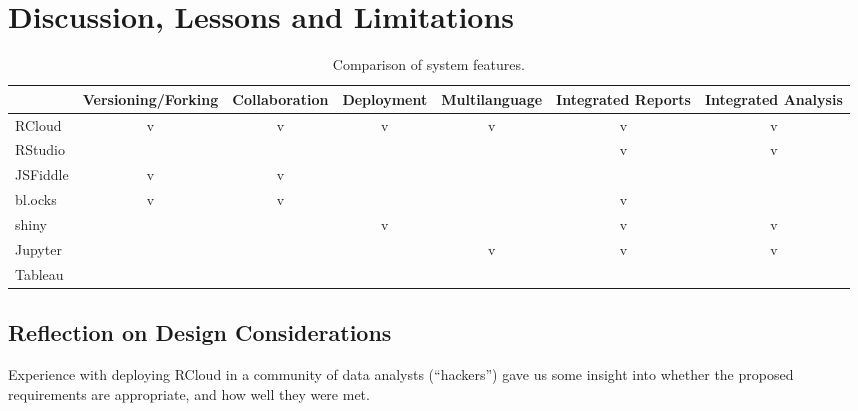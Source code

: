 \section{Discussion, Lessons and Limitations}
\label{sec:discussion}

\begin{table*}
  \centering
  \begin{tabular}{l|cccccc}
           & Versioning/Forking & Collaboration & Deployment & Multilanguage & Integrated Reports & Integrated Analysis \\
    \hline
RCloud     &       v            &       v       &     v      &      v        &           v        &           v         \\
RStudio    &                    &               &            &               &           v        &           v         \\
JSFiddle   &       v            &       v       &            &               &                    &                     \\
bl.ocks    &       v            &       v       &            &               &           v        &                     \\
shiny      &                    &               &     v      &               &           v        &           v         \\
Jupyter    &                    &               &            &      v        &           v        &           v         \\
Tableau    &                    &               &            &               &                    &                     
  \end{tabular}
  \caption{Comparison of system features.}
\end{table*}


\subsection{Reflection on Design Considerations}

Experience with deploying RCloud in a community of data analysts
(``hackers'') gave us some insight into whether the proposed
requirements are appropriate, and how well they were met.


